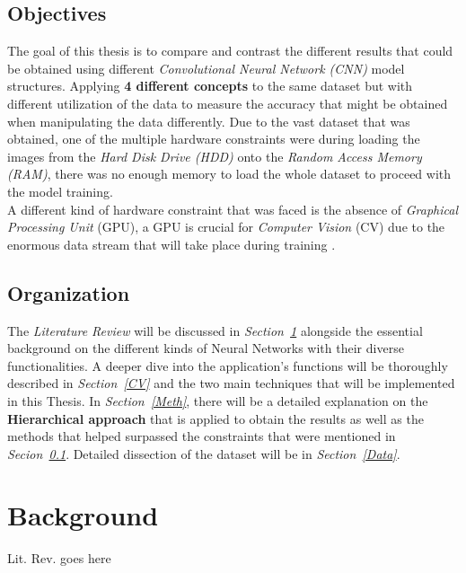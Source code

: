 \documentclass[12pt]{extarticle}
\begin{document}
	\subsection{Objectives}\label{Obj}
	The goal of this thesis is to compare and contrast the different results that could be obtained using different \emph{Convolutional Neural Network (CNN)} model structures. Applying \textbf{4 different concepts} to the same dataset but with different utilization of the data to measure the accuracy that might be obtained when manipulating the data differently. Due to the vast dataset that was obtained, one of the multiple hardware constraints were during loading the images from the \emph{Hard Disk Drive (HDD)} onto the \emph{Random Access Memory (RAM)}, there was no enough memory to load the whole dataset to proceed with the model training. \\[5mm]
	A different kind of hardware constraint that was faced is the absence of \emph{Graphical Processing Unit} (GPU), a GPU is crucial for \emph{Computer Vision} (CV) due to the enormous data stream that will take place during training \cite{GPU} \cite{GPU}.
	\subsection{Organization}\label{Org}
	The \emph{Literature Review} will be discussed in \emph{Section~\ref{Lit. Rev.}} alongside the essential background on the different kinds of Neural Networks with their diverse functionalities. A deeper dive into the application's functions will be thoroughly described in \emph{Section~\ref{CV}} and the two main techniques that will be implemented in this Thesis. In \emph{Section~\ref{Meth}}, there will be a detailed explanation on the \textbf{Hierarchical approach} that is applied to obtain the results as well as the methods that helped surpassed the constraints that were mentioned in \emph{Secion~\ref{Obj}}. Detailed dissection of the dataset will be in \emph{Section~\ref{Data}}.
	\newpage
	\section{Background}\label{Lit. Rev.}
	Lit. Rev. goes here
\end{document}

